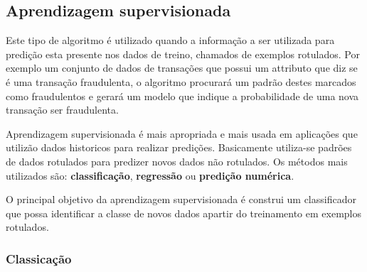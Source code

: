 \subsection{Aprendizagem supervisionada}
\label{subsec:supervised-learning}
Este tipo de algoritmo é utilizado quando a informação a ser utilizada para predição esta presente nos dados de treino, chamados de 
exemplos rotulados. Por exemplo um conjunto de dados de transações que possui um attributo que diz se é uma transação fraudulenta, o 
algoritmo procurará um padrão destes marcados como fraudulentos e gerará um modelo que indique a probabilidade de uma nova transação 
ser fraudulenta.

Aprendizagem supervisionada é mais apropriada e mais usada em aplicações que utilizão dados historicos para realizar predições. 
Basicamente utiliza-se padrões de dados rotulados para predizer novos dados não rotulados. 
Os métodos mais utilizados são: \textbf{classificação}, \textbf{regressão} ou \textbf{predição numérica}.

O principal objetivo da aprendizagem supervisionada é construi um classificador que possa identificar a classe de novos dados apartir
do treinamento em exemplos rotulados.     


\subsubsection{Classicação}
\label{subsubsec:classificacao}

